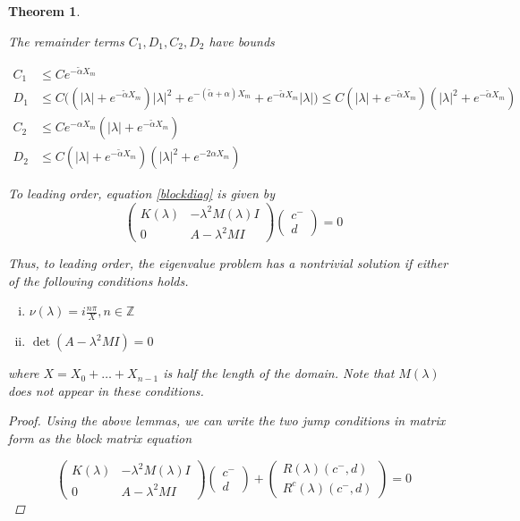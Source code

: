 \documentclass[12pt]{article}
\def\Z{{\mathbb Z}}
\newtheorem{theorem}{Theorem}
\begin{document}
\begin{theorem}
\begin{enumerate}
\end{enumerate}

The remainder terms $C_1, D_1, C_2, D_2$ have bounds

\begin{align*}
C_1 &\leq C e^{-\tilde{\alpha} X_m} \\
D_1 &\leq C \Big( (|\lambda| + e^{-\tilde{\alpha} X_m})|\lambda|^2 + e^{-(\tilde{\alpha} + \alpha) X_m} + e^{-\tilde{\alpha} X_m} |\lambda| \Big) \leq C (|\lambda| + e^{-\tilde{\alpha} X_m})(|\lambda|^2 + e^{-\tilde{\alpha} X_m})\\
C_2 &\leq C e^{-\alpha X_m}(|\lambda| + e^{-\tilde{\alpha} X_m}) \\
D_2 &\leq C (|\lambda| + e^{-\tilde{\alpha} X_m} )( |\lambda|^2 + e^{-2 \alpha X_m} )
\end{align*}

To leading order, equation \eqref{blockdiag} is given by
\begin{equation}
\begin{pmatrix}
K(\lambda) & -\lambda^2 M(\lambda) I  \\
0 & A - \lambda^2 MI 
\end{pmatrix}
\begin{pmatrix}c^- \\ d \end{pmatrix} = 0
\end{equation}

Thus, to leading order, the eigenvalue problem has a nontrivial solution if either of the following conditions holds.

\begin{enumerate}[(i)]
\item $\nu(\lambda) = i \frac{n \pi}{X}, n \in \Z$ 
\item $\det(A - \lambda^2 MI) = 0$
\end{enumerate}

where $X = X_0 + \dots + X_{n-1}$ is half the length of the domain. Note that $M(\lambda)$ does not appear in these conditions.\\

\begin{proof}

Using the above lemmas, we can write the two jump conditions in matrix form as the block matrix equation

\[
\begin{pmatrix}
K(\lambda) & -\lambda^2 M(\lambda) I \\
0 & A - \lambda^2 MI
\end{pmatrix}
\begin{pmatrix}c^- \\ d \end{pmatrix} +
\begin{pmatrix} R(\lambda)(c^-,d) \\ R^c( \lambda)(c^-,d) \end{pmatrix}  = 0
\]


\end{proof}
\end{theorem}
\end{document}
